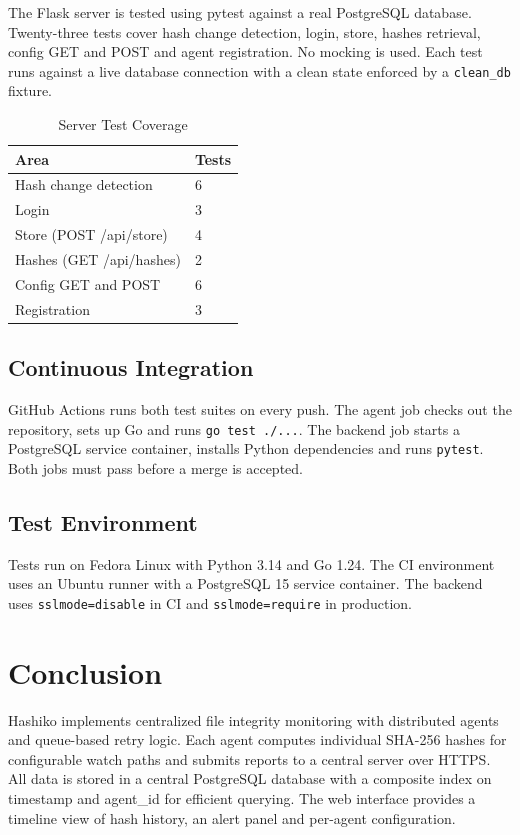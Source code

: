 \documentclass[conference]{IEEEtran}
\begin{document}
The Flask server is tested using pytest against a real PostgreSQL database. Twenty-three tests cover hash change detection, login, store, hashes retrieval, config GET and POST and agent registration. No mocking is used. Each test runs against a live database connection with a clean state enforced by a \texttt{clean\_db} fixture.

\begin{table}[h]
\centering
\caption{Server Test Coverage}
\begin{tabular}{|p{4cm}|p{4cm}|}
\hline
\textbf{Area} & \textbf{Tests} \\
\hline
Hash change detection & 6 \\
\hline
Login & 3 \\
\hline
Store (POST /api/store) & 4 \\
\hline
Hashes (GET /api/hashes) & 2 \\
\hline
Config GET and POST & 6 \\
\hline
Registration & 3 \\
\hline
\end{tabular}
\end{table}

\subsection{Continuous Integration}

GitHub Actions runs both test suites on every push. The agent job checks out the repository, sets up Go and runs \texttt{go test ./...}. The backend job starts a PostgreSQL service container, installs Python dependencies and runs \texttt{pytest}. Both jobs must pass before a merge is accepted.

\subsection{Test Environment}

Tests run on Fedora Linux with Python 3.14 and Go 1.24. The CI environment uses an Ubuntu runner with a PostgreSQL 15 service container. The backend uses \texttt{sslmode=disable} in CI and \texttt{sslmode=require} in production.

\section{Conclusion}

Hashiko implements centralized file integrity monitoring with distributed agents and queue-based retry logic. Each agent computes individual SHA-256 hashes for configurable watch paths and submits reports to a central server over HTTPS. All data is stored in a central PostgreSQL database with a composite index on timestamp and agent\_id for efficient querying. The web interface provides a timeline view of hash history, an alert panel and per-agent configuration.
\end{document}
